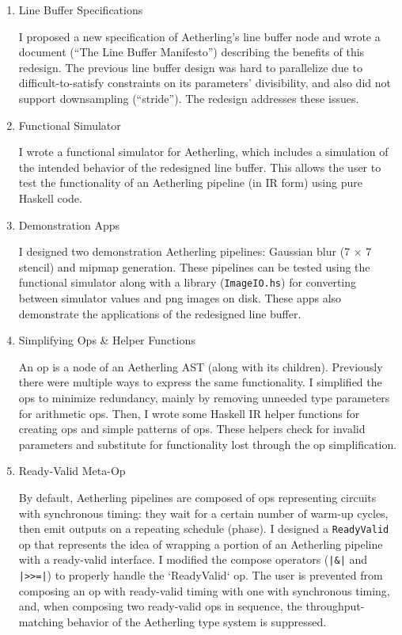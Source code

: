 \documentclass[12pt]{article}
\begin{document}
\begin{enumerate}

\item Line Buffer Specifications

I proposed a new specification of Aetherling's line buffer node and
wrote a document (``The Line Buffer Manifesto'') describing the
benefits of this redesign. The previous line buffer design was hard to
parallelize due to difficult-to-satisfy constraints on its parameters'
divisibility, and also did not support downsampling (``stride'').
The redesign addresses these issues.


\item Functional Simulator

I wrote a functional simulator for Aetherling, which includes a
simulation of the intended behavior of the redesigned line
buffer. This allows the user to test the functionality of an
Aetherling pipeline (in IR form) using pure Haskell code.

\item Demonstration Apps

I designed two demonstration Aetherling pipelines: Gaussian blur (7
$\times$ 7 stencil) and mipmap generation. These pipelines can be
tested using the functional simulator along with a library
(\texttt{ImageIO.hs}) for converting between simulator values and png
images on disk. These apps also demonstrate the applications of the
redesigned line buffer.

\item Simplifying Ops \& Helper Functions

An op is a node of an Aetherling AST (along with its
children). Previously there were multiple ways to express the same
functionality. I simplified the ops to minimize redundancy, mainly by
removing unneeded type parameters for arithmetic ops. Then, I wrote
some Haskell IR helper functions for creating ops and simple patterns
of ops. These helpers check for invalid parameters and substitute for
functionality lost through the op simplification.

\item Ready-Valid Meta-Op

By default, Aetherling pipelines are composed of ops representing
circuits with synchronous timing: they wait for a certain number of
warm-up cycles, then emit outputs on a repeating schedule (phase). I
designed a \texttt{ReadyValid} op that represents the idea of wrapping
a portion of an Aetherling pipeline with a ready-valid interface.  I
modified the compose operators (\texttt{|\&|} and \texttt{|>>=|}) to
properly handle the `ReadyValid` op.  The user is prevented from
composing an op with ready-valid timing with one with synchronous
timing, and, when composing two ready-valid ops in sequence, the
throughput-matching behavior of the Aetherling type system is
suppressed.


\end{enumerate}
\end{document}
